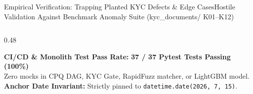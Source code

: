 \documentclass[aspectratio=169,10pt]{beamer}
\begin{document}
\begin{frame}{Empirical Verification: Trapping Planted KYC Defects \& Edge Cases}{Hostile Validation Against Benchmark Anomaly Suite (kyc\_documents/ K01--K12)}
\begin{columns}[T]
\begin{column}{0.48\textwidth}
      \vspace{0.06cm}
      \begin{tcolorbox}[accentbox, title={\fontsize{6.5pt}{7.8pt}\selectfont\textbf{Automated Test Suite Status}}, coltitle=charcoal]
        {\fontsize{5.4pt}{6.6pt}\selectfont
        \textbf{CI/CD \& Monolith Test Pass Rate:} \textcolor{successgreen}{\textbf{37 / 37 Pytest Tests Passing (100\%)}} \\
        Zero mocks in CPQ DAG, KYC Gate, RapidFuzz matcher, or LightGBM model. \\
        \textbf{Anchor Date Invariant:} Strictly pinned to \texttt{datetime.date(2026, 7, 15)}.
        }
      \end{tcolorbox}
    \end{column}
  \end{columns}
\end{frame}
\end{document}
